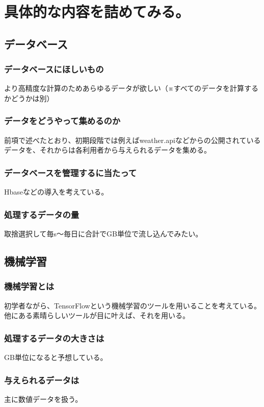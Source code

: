 \documentclass{scrartcl}
\begin{document}
\section{具体的な内容を詰めてみる。}
\label{sec:orgecfa2eb}
\subsection{データベース}
\label{sec:org3d6e20b}
\subsubsection{データベースにほしいもの}
\label{sec:orga2ae591}
より高精度な計算のためあらゆるデータが欲しい（※すべてのデータを計算するかどうかは別）\\
\subsubsection{データをどうやって集めるのか}
\label{sec:orgacbe5b5}
前項で述べたとおり、初期段階では例えばweather.apiなどからの公開されているデータを、それからは各利用者から与えられるデータを集める。\\
\subsubsection{データベースを管理するに当たって}
\label{sec:orga564ff0}
Hbaseなどの導入を考えている。\\
\subsubsection{処理するデータの量}
\label{sec:org8352e90}
取捨選択して毎s〜毎日に合計でGB単位で流し込んでみたい。\\
\subsection{機械学習}
\label{sec:orgf958110}
\subsubsection{機械学習とは}
\label{sec:orgb202540}
初学者ながら、TensorFlowという機械学習のツールを用いることを考えている。他にある素晴らしいツールが目に叶えば、それを用いる。\\
\subsubsection{処理するデータの大きさは}
\label{sec:orgcc79f18}
GB単位になると予想している。\\
\subsubsection{与えられるデータは}
\label{sec:orgb88725f}
主に数値データを扱う。\\
\end{document}

